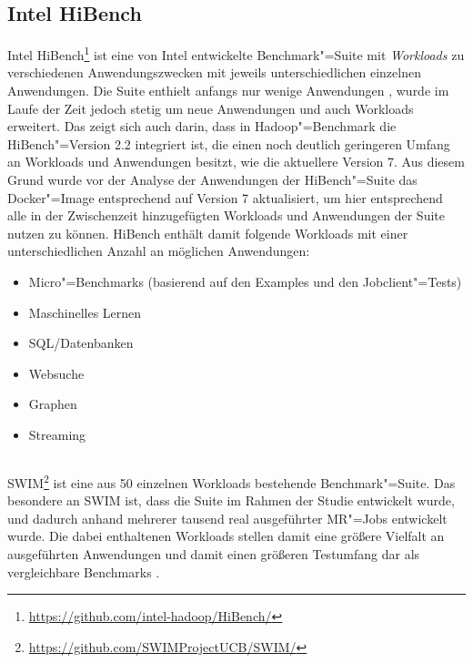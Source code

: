 \subsection{Intel HiBench}
\label{subsec:hibench}

Intel HiBench\footnote{\url{https://github.com/intel-hadoop/HiBench/}} ist eine von Intel entwickelte Benchmark"=Suite mit \emph{Workloads} zu verschiedenen Anwendungszwecken mit jeweils unterschiedlichen einzelnen Anwendungen.
Die Suite enthielt anfangs nur wenige Anwendungen \cite{Huang2010}, wurde im Laufe der Zeit jedoch stetig um neue Anwendungen und auch Workloads erweitert.
Das zeigt sich auch darin, dass in Hadoop"=Benchmark die HiBench"=Version \mbox{2.2} integriert ist, die einen noch deutlich geringeren Umfang an Workloads und Anwendungen besitzt, wie \zB die aktuellere Version 7.
Aus diesem Grund wurde vor der Analyse der Anwendungen der HiBench"=Suite das Docker"=Image entsprechend auf Version 7 aktualisiert, um hier entsprechend alle in der Zwischenzeit hinzugefügten Workloads und Anwendungen der Suite nutzen zu können.
HiBench enthält damit folgende Workloads mit einer unterschiedlichen Anzahl an möglichen Anwendungen:

\begin{itemize}
    \item Micro"=Benchmarks (basierend auf den Examples und den Jobclient"=Tests)
    \item Maschinelles Lernen
    \item SQL/Datenbanken
    \item Websuche
    \item Graphen
    \item Streaming
\end{itemize}

\subsection{}
\label{subsec:swim}

\gls{SWIM}\footnote{\url{https://github.com/SWIMProjectUCB/SWIM/}} ist eine aus 50 einzelnen Workloads bestehende Benchmark"=Suite.
Das besondere an \gls{SWIM} ist, dass die Suite im Rahmen der Studie \cite{Chen2012} entwickelt wurde, und dadurch anhand mehrerer tausend real ausgeführter \gls{MR}"=Jobs entwickelt wurde.
Die dabei enthaltenen Workloads stellen damit eine größere Vielfalt an ausgeführten Anwendungen und damit einen größeren Testumfang dar als vergleichbare Benchmarks \cite{SwimWikiHome}.


